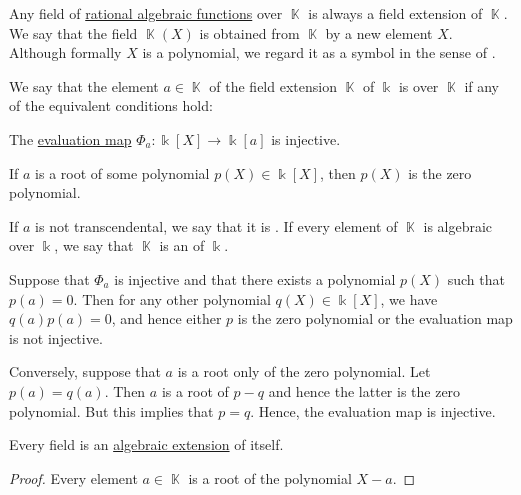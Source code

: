 \begin{remark}\label{rem:adjoint_extension_field}
  Any field of \hyperref[def:rational_algebraic_function]{rational algebraic functions} over \( \BbbK \) is always a field extension of \( \BbbK \). We say that the field \( \BbbK(X) \) is obtained from \( \BbbK \) by  a new element \( X \). Although formally \( X \) is a polynomial, we regard it as a symbol in the sense of .
\end{remark}

\begin{definition}\label{def:transcendetal_element}
  We say that the element \( a \in \BbbK \) of the field extension \( \BbbK \) of \( \Bbbk \) is  over \( \BbbK \) if any of the equivalent conditions hold:
  \begin{thmenum}
     The \hyperref[thm:polynomial_ring_universal_property]{evaluation map} \( \Phi_a: \Bbbk[X] \to \Bbbk[a] \) is injective.

     If \( a \) is a root of some polynomial \( p(X) \in \Bbbk[X] \), then \( p(X) \) is the zero polynomial.
  \end{thmenum}

  If \( a \) is not transcendental, we say that it is . If every element of \( \BbbK \) is algebraic over \( \Bbbk \), we say that \( \BbbK \) is an  of \( \Bbbk \).
\end{definition}
\begin{defproof}
   Suppose that \( \Phi_a \) is injective and that there exists a polynomial \( p(X) \) such that \( p(a) = 0 \). Then for any other polynomial \( q(X) \in \Bbbk[X] \), we have \( q(a) p(a) = 0 \), and hence either \( p \) is the zero polynomial or the evaluation map is not injective.

   Conversely, suppose that \( a \) is a root only of the zero polynomial. Let \( p(a) = q(a) \). Then \( a \) is a root of \( p - q \) and hence the latter is the zero polynomial. But this implies that \( p = q \). Hence, the evaluation map is injective.
\end{defproof}

\begin{proposition}\label{thm:field_is_algebraic_over_itself}
  Every field is an \hyperref[def:transcendental_element]{algebraic extension} of itself.
\end{proposition}
\begin{proof}
  Every element \( a \in \BbbK \) is a root of the polynomial \( X - a \).
\end{proof}

